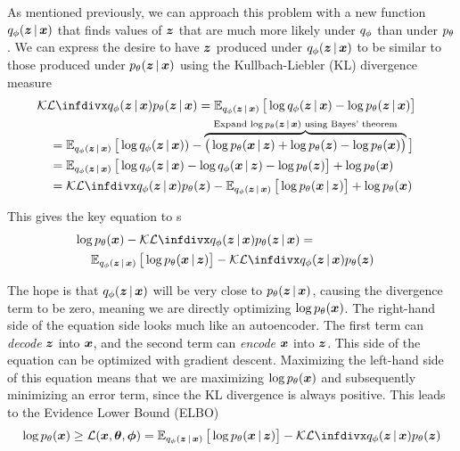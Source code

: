 As mentioned previously, we can approach this problem with a new function $\qphi \given{\vz}{\vx}$ that finds values of $\boldsymbol{z}$ that are much more likely under $q_{\phi}$ than under $p_{\theta}$. We can express the desire to have $\boldsymbol{z}$ produced under $\qphi \given{\vz}{\vx}$ to be similar to those produced under $\ptheta \given{\vz}{\vx}$ using the Kullbach-Liebler (KL) divergence measure
\begin{align}
\label{kl-eq}
\lefteqn{\KL{\qphi \given{\vz}{\vx}}{\ptheta \given{\vz}{\vx}} =
\E_{\qphi \given{\vz}{\vx} } \big [\log{\qphi \given{\vz}{\vx}} - \log{\ptheta \given{\vz}{\vx}} \big ] \nonumber}\\
& & & = \E_{\qphi \given{\vz}{\vx} }\big {[} \log{\qphi \given{\vz}{\vx})} - \overbrace{ \big{(} \log{\ptheta \given{\vx}{\vz}} + \log{\ptheta(\vz)} - \log{\ptheta(\vx)} \big{)} }^{\text{Expand $\log \ptheta \given{\vz}{\vx}$ using Bayes' theorem}} \big ] \nonumber\\
& & & = \E_{\qphi \given{\vz}{\vx} } \big{[} \log{\qphi \given{\vz}{\vx}} - \log{\qphi \given{\vx}{\vz}} - \log{\ptheta(\vz)} \big{]} + \log{\ptheta(\vx)} \nonumber \\
& & & = \KL{\qphi\given{\vz}{\vx}}{\ptheta(\vz)} - \E_{\qphi\given{\vz}{\vx} } \big{[} \log{\ptheta \given{\vx}{\vz}} \big{]} + \log{\ptheta(\vx)}
\end{align}

This gives the key equation to \vae{}s
\begin{align}\label{eq:vae}
\nonumber \lefteqn{\log{\ptheta(\vx)} - \KL{\qphi \given{\vz}{\vx}}{\ptheta \given{\vz}{\vx}} =}\\
& & & \E_{\qphi \given{\vz}{\vx}} \big{[} \log{\ptheta \given{\vx}{\vz}} \big{]} - \KL{\qphi \given{\vz}{\vx}}{\ptheta(\vz)}
\end{align}

The hope is that $\qphi \given{\vz}{\vx}$ will be very close to $\ptheta \given{\vz}{\vx}$, causing the divergence term to be zero, meaning we are directly optimizing $\log p_{\theta}(\boldsymbol{x})$. The right-hand side of the equation side looks much like an autoencoder. The first term can \emph{decode} $\boldsymbol{z}$ into $\boldsymbol{x}$, and the second term can \emph{encode} $\boldsymbol{x}$ into $\boldsymbol{z}$. This side of the equation can be optimized with gradient descent. Maximizing the left-hand side of this equation means that we are maximizing $\log{p_{\theta}(\boldsymbol{x})}$ and subsequently minimizing an error term, since the KL divergence is always positive. This leads to the Evidence Lower Bound (ELBO)
\begin{equation} \label{eq:elbo}
    \log \ptheta(\vx) \geq \mathcal{L}(\vx, \vth, \vph) = \E_{\qphi \given{\vz}{\vx} } \big{[} \log{\ptheta \given{\vx}{\vz}} \big{]} - \KL{\qphi \given{\vz}{\vx}}{\ptheta(\vz)}
\end{equation}


